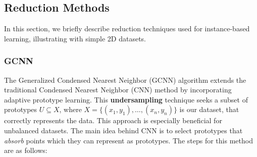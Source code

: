 
\subsection{Reduction Methods}\label{reduced-methods-sec}
In this section, we briefly describe reduction techniques used for instance-based learning, illustrating with simple 2D datasets.

\subsubsection{GCNN}

The Generalized Condensed Nearest Neighbor (GCNN) \cite{chang2006adaptive} algorithm extends the traditional Condensed Nearest Neighbor (CNN) method by incorporating adaptive prototype learning. This \textbf{undersampling} technique seeks a subset of prototypes $U \subseteq X$, where $X = \{(x_1, y_1), \ldots, (x_n, y_n)\}$ is our dataset, that correctly represents the data. This approach is especially beneficial for unbalanced datasets. The main idea behind CNN is to select prototypes that \textit{absorb} points which they can represent as prototypes. The steps for this method are as follows:

